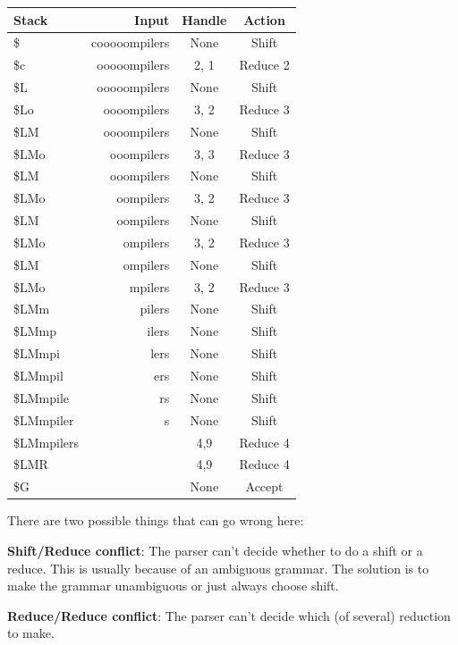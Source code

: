 \begin{center} 
  \begin{tabular}{|l|r|c|c|}
    \hline
    Stack & Input         & Handle & Action\\ \hline
    \$    & cooooompilers & None   & Shift\\
    \$c   & ooooompilers  & 2, 1   & Reduce 2\\
    \$L   & ooooompilers  & None   & Shift\\ 
    \$Lo  & oooompilers   & 3, 2   & Reduce 3\\
    \$LM  & oooompilers   & None   & Shift\\
    \$LMo & ooompilers    & 3, 3   & Reduce 3\\
    \$LM  & ooompilers    & None   & Shift\\
    \$LMo & oompilers     & 3, 2   & Reduce 3\\
    \$LM  & oompilers     & None   & Shift\\
    \$LMo & ompilers      & 3, 2   & Reduce 3\\
    \$LM  & ompilers      & None   & Shift\\
    \$LMo & mpilers       & 3, 2   & Reduce 3\\
    \$LMm & pilers        & None   & Shift\\
    \$LMmp & ilers        & None   & Shift\\
    \$LMmpi & lers        & None   & Shift\\
    \$LMmpil & ers        & None   & Shift\\
    \$LMmpile & rs        & None   & Shift\\
    \$LMmpiler & s        & None   & Shift\\
    \$LMmpilers &         & 4,9    & Reduce 4\\
    \$LMR       &         & 4,9    & Reduce 4\\
    \$G         &         & None   & Accept\\ \hline
  \end{tabular}
\end{center}

There are two possible things that can go wrong here:

\begin{description}
  \item \textbf{Shift/Reduce conflict}: The parser can't decide whether to do 
  a shift or a reduce. This is usually because of an ambiguous grammar. The 
  solution is to make the grammar unambiguous or just always choose shift.
  \item \textbf{Reduce/Reduce conflict}: The parser can't decide which (of 
  several) reduction to make.
\end{description}

